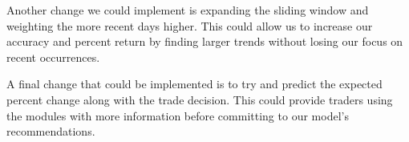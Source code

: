 \documentclass{article}
\begin{document}
Another change we could implement is expanding the sliding window and weighting the more recent days higher. This could allow us to increase our accuracy and percent return by finding larger trends without losing our focus on recent occurrences.

A final change that could be implemented is to try and predict the expected percent change along with the trade decision. This could provide traders using the modules with more information before committing to our model's recommendations.

%
%
%
%
%
%
\end{document}
